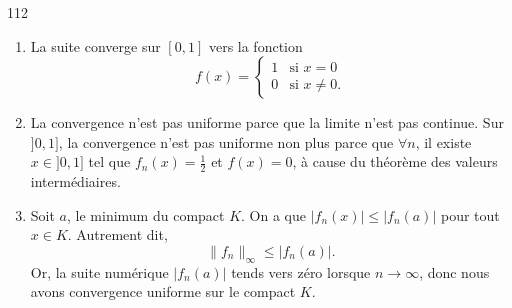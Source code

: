 

\begin{corrige}{112}

%

\begin{enumerate}
\item La suite converge sur $[0,1]$ vers la fonction
\begin{equation}
	f(x)=
\begin{cases}
	1	&	\text{si }x=0\\
	0	&	 \text{si }x\neq 0.
\end{cases}
\end{equation}

\item La convergence n'est pas uniforme parce que la limite n'est pas continue. Sur $]0,1]$, la convergence n'est pas uniforme non plus parce que $\forall n$, il existe $x\in]0,1]$ tel que $f_n(x)=\frac{ 1 }{2}$ et $f(x)=0$, à cause du théorème des valeurs intermédiaires.

\item Soit $a$, le minimum du compact $K$. On a que $| f_n(x) |\leq | f_n(a) |$ pour tout $x\in K$. Autrement dit,
\begin{equation}
	\| f_n \|_{\infty}\leq | f_n(a) |.
\end{equation}
Or, la suite numérique $| f_n(a) |$ tends vers zéro lorsque $n\to\infty$, donc nous avons convergence uniforme sur le compact $K$.
\end{enumerate}
\end{corrige}
